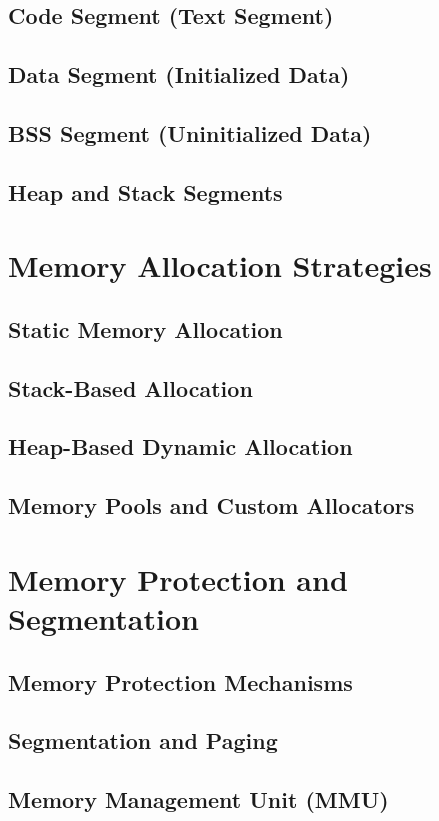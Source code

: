 \documentclass[12pt, oneside]{book}
\begin{document}
	\subsection{Code Segment (Text Segment)}
	\subsection{Data Segment (Initialized Data)}
	\subsection{BSS Segment (Uninitialized Data)}
	\subsection{Heap and Stack Segments}
	\section{Memory Allocation Strategies}
	\subsection{Static Memory Allocation}
	\subsection{Stack-Based Allocation}
	\subsection{Heap-Based Dynamic Allocation}
	\subsection{Memory Pools and Custom Allocators}
	\section{Memory Protection and Segmentation}
	\subsection{Memory Protection Mechanisms}
	\subsection{Segmentation and Paging}
	\subsection{Memory Management Unit (MMU)}
\end{document}
